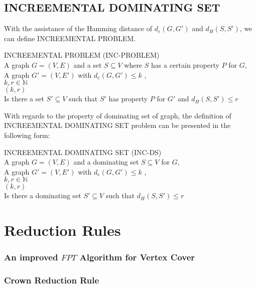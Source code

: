 \subsection{\large{I}\normalsize{NCREEMENTAL} \large{D}\normalsize{OMINATING} \Large{S}\normalsize{ET}}\label{subsec:incds}
With the assistance of the Hamming distance of $d_e$$(G,G')$ and $d_H$$(S,S')$, we can define \large{I}\normalsize{NCREEMENTAL} \large{P}\normalsize{ROBLEM}.
\begin{dproblem}
{\sc \large{I}\normalsize{NCREEMENTAL} \large{P}\normalsize{ROBLEM} (\large{I}\normalsize{NC}-\large{P}\normalsize{ROBLEM})}\\
\instance A graph $G=(V,E)$ and a set $S \subseteq V$ where $S$ has a certain property  $P$ for $G$,\\
\quad \quad A graph $G'=(V,E')$ with $d_e$$(G,G') \leqslant k$ , \\
\quad \quad $k,r \in \mathds{N}$ \\
\parameter $(k,r)$ \\
\ques Is there a set $S' \subseteq V$ such that $S'$ has property  $P$ for $G'$ and $d_H$$(S,S') \leqslant r$\\
\cite{downey2014}
\end{dproblem}
With regards to the property of dominating set of graph, the definition of \large{I}\normalsize{NCREEMENTAL} \large{D}\normalsize{OMINATING}  \Large{S}\normalsize{ET} problem can be presented in the following form:
\begin{dproblem}
{\sc \large{I}\normalsize{NCREEMENTAL} \large{D}\normalsize{OMINATING}  \Large{S}\normalsize{ET} \large{(}\large{I}\normalsize{NC}-\large{DS}\large{)}}\\
\instance A graph $G=(V,E)$ and a dominating set $S \subseteq V$ for $G$,\\
\qquad   A graph $G'=(V,E')$ with $d_e$$(G,G') \leqslant k$ , \\
\quad \quad $k,r \in \mathds{N}$ \\
\parameter \quad $(k,r)$ \\
\ques \quad Is there a dominating set $S' \subseteq V$ such that $d_H$$(S,S') \leqslant r$\\
\cite{downey2014}
\end{dproblem}
\section{Reduction Rules} \label{sec:reduce}
\subsubsection{An improved ${FPT}$ Algorithm for Vertex Cover} \label{subsubsec:fptvc}
\subsubsection{Crown Reduction Rule} \label{subsubsec:crown}
